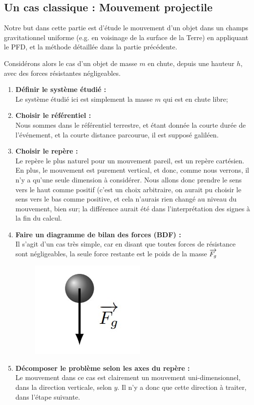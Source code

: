 \documentclass[11pt,a4paper]{article}
\begin{document}
\subsection{Un cas classique : Mouvement projectile}
Notre but dans cette partie est d'étude le mouvement d'un objet dans un champs gravitationnel uniforme (e.g. en voisinage de la surface de la Terre) en appliquant le PFD, et la méthode détaillée dans la partie précédente. 

Considérons alors le cas d’un objet de masse $m$ en chute, depuis une hauteur $h$, avec des forces résistantes négligeables. 

\begin{enumerate}
    \item \textbf{Définir le système étudié : } \\
    Le système étudié ici est simplement la masse $m$ qui est en chute libre; 
    \item \textbf{Choisir le référentiel :} \\
    Nous sommes dans le référentiel terrestre, et étant donnée la courte durée de l'événement, et la courte distance parcourue, il est supposé galiléen. 
    \item \textbf{Choisir le repère : }\\
    Le repère le plus naturel pour un mouvement pareil, est un repère cartésien. En plus, le mouvement est purement vertical, et donc, comme nous verrons, il n'y a qu'une seule dimension à considérer. 
    Nous allons donc prendre le sens vers le haut comme positif (c'est un choix arbitraire, on aurait pu choisir le sens vers le bas comme positive, et cela n'aurais rien changé au niveau du mouvement, bien sur; la différence aurait été dans l'interprétation des signes à la fin du calcul.
    \item \textbf{Faire un diagramme de bilan des forces (BDF) : }\\
    Il s'agit d'un cas très simple, car en disant que toutes forces de résistance sont négligeables, la seule force restante est le poids de la masse $\overrightarrow{F_g}$
    \begin{figure}[H]
        \centering
        \includegraphics[width=0.1\linewidth]{imgs/p3/chutelibre.jpg}
    \end{figure}
    
    \item \textbf{Décomposer le problème selon les axes du repère : } \\
    Le mouvement dans ce cas est clairement un mouvement uni-dimensionnel, dans la direction verticale, selon $y$. Il n'y a donc que cette direction à traiter, dans l'étape suivante. 


\end{enumerate}
\end{document}
